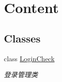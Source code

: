 \hypertarget{group__content}{\section{\-Content}
\label{group__content}
}
\subsection*{\-Classes}
\begin{DoxyCompactItemize}
\item 
class \hyperlink{classLoginCheck}{\-Login\-Check}
\begin{DoxyCompactList}\small\item\em 登录管理类 \end{DoxyCompactList}\end{DoxyCompactItemize}
